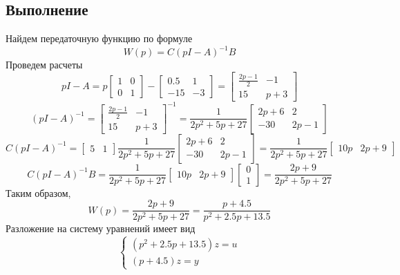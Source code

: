 \documentclass[a4paper, 12pt]{article}
\begin{document}
    \subsection{Выполнение}
    Найдем передаточную функцию по формуле
    $$W(p)=C(pI-A)^{-1}B$$
    Проведем расчеты
    $$pI-A=
    p
    \begin{bmatrix}
        1 & 0\\
        0 & 1
    \end{bmatrix}
    -
    \begin{bmatrix}
        0.5 & 1\\
        -15 & -3
    \end{bmatrix}
    =
    \begin{bmatrix}
        \frac{2p-1}{2} & -1\\
        15 & p+3
    \end{bmatrix}$$
    $$(pI-A)^{-1}=
    \begin{bmatrix}
        \frac{2p-1}{2} & -1\\
        15 & p+3
    \end{bmatrix}^{-1}=
    \dfrac{1}{2p^2+5p+27}
    \begin{bmatrix}
        2p+6 & 2\\
        -30 & 2p-1
    \end{bmatrix}$$
    $$C(pI-A)^{-1}=\begin{bmatrix}
        5 & 1
    \end{bmatrix}
    \dfrac{1}{2p^2+5p+27}
    \begin{bmatrix}
        2p+6 & 2\\
        -30 & 2p-1
    \end{bmatrix}=
    \dfrac{1}{2p^2+5p+27}
    \begin{bmatrix}
        10p & 2p+9
    \end{bmatrix}$$
    $$C(pI-A)^{-1}B=\dfrac{1}{2p^2+5p+27}
    \begin{bmatrix}
        10p & 2p+9
    \end{bmatrix}
    \begin{bmatrix}
        0\\
        1
    \end{bmatrix}=
    \dfrac{2p+9}{2p^2+5p+27}
    $$
    Таким образом,
    $$W(p)=\dfrac{2p+9}{2p^2+5p+27}=\dfrac{p+4.5}{p^2+2.5p+13.5}$$
    Разложение на систему уравнений имеет вид
    $$
    \begin{cases}
        (p^2+2.5p+13.5)z=u\\
        (p+4.5)z=y
    \end{cases}
    $$
\end{document}
